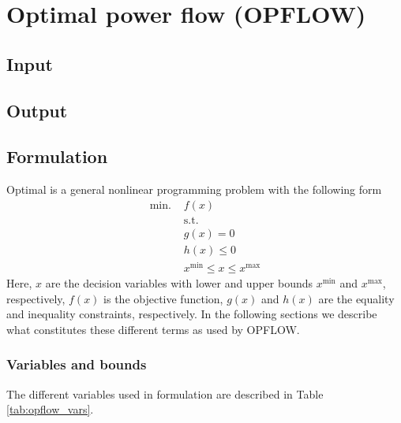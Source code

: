 \chapter{Optimal power flow (OPFLOW)}\label{chap:opflow}

\section{Input}
\section{Output}
\section{Formulation}
Optimal is a general nonlinear programming problem with the following form
\begin{align}
\text{min. }& f(x) \\
&\text{s.t.} \nonumber \\
& g(x) = 0 \\
& h(x) \le 0 \\
& x^{\text{min}} \le x \le x^{\text{max}}
\end{align}
Here, $x$ are the decision variables with lower and upper bounds $x^{\text{min}}$ and $x^{\text{max}}$, respectively, $f(x)$ is the objective function, $g(x)$ and $h(x)$ are the equality and inequality constraints, respectively. In the following sections we describe what constitutes these different terms as used by OPFLOW.

\subsection{Variables and bounds} \label{subsec:opflow_var}

The different variables used in \opflow formulation are described in Table \ref{tab:opflow_vars}.

